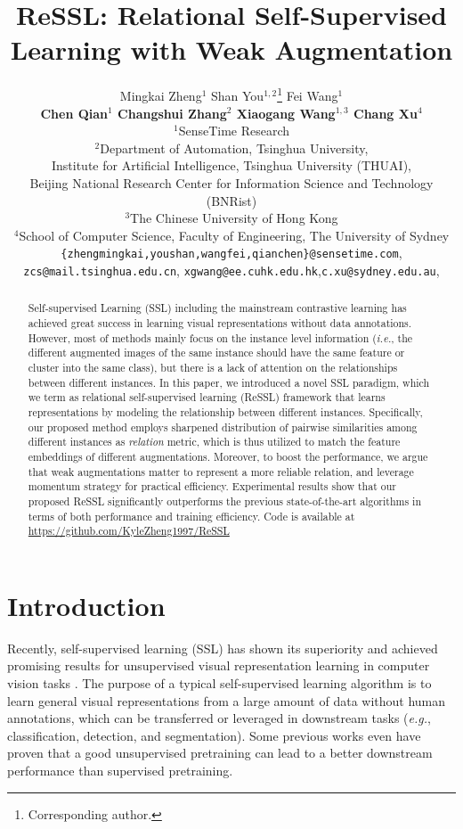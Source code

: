 \documentclass{article}
\title{ReSSL: Relational Self-Supervised Learning with Weak Augmentation}
\author{Mingkai Zheng$^1$ \quad Shan You$^{1,2}$\thanks{Corresponding author.}  \quad Fei Wang$^1$\\
	 \textbf{Chen Qian$^1$ \quad Changshui Zhang$^{2}$ \quad Xiaogang Wang$^{1,3}$ \quad Chang Xu$^4$}\\
	$^1$SenseTime Research\\
	 $^{2}$Department of Automation, Tsinghua University,\\
Institute for Artificial Intelligence, Tsinghua University (THUAI), \\
Beijing National Research Center for Information Science and Technology (BNRist)\\
	 $^3$The Chinese University of Hong Kong\\
	$^4$School of Computer Science, Faculty of Engineering, The University of Sydney\\
	 \texttt{\{zhengmingkai,youshan,wangfei,qianchen\}@sensetime.com}, \\
 \texttt{zcs@mail.tsinghua.edu.cn}, \texttt{xgwang@ee.cuhk.edu.hk},\texttt{c.xu@sydney.edu.au},\\ 
	
}
\newcommand{\<}{\left\langle}
\renewcommand{\>}{\right\rangle}
\newcommand{\eg}{{\emph{e.g.}}}
\newcommand{\ie}{{\emph{i.e.}}}
\begin{document}
\maketitle

\vspace{-10pt}
\begin{abstract}
\vspace{-10pt}


Self-supervised Learning (SSL) including the mainstream contrastive learning has achieved great success in learning visual representations without data annotations. However, most of methods mainly focus on the instance level information (\ie, the different augmented images of the same instance should have the same feature or cluster into the same class), but there is a lack of attention on the relationships between different instances. In this paper, we introduced a novel SSL paradigm, which we term as relational self-supervised learning  (ReSSL) framework that learns representations by modeling the relationship between different instances. Specifically, our proposed method employs sharpened distribution of pairwise similarities among different instances as \textit{relation} metric, which is thus utilized to match the feature embeddings of different augmentations. Moreover, to boost the performance, we argue that weak augmentations matter to represent a more reliable relation, and leverage momentum strategy for practical efficiency. Experimental results show that our proposed ReSSL significantly outperforms the previous state-of-the-art algorithms in terms of both performance and training efficiency. Code is available at \href{https://github.com/KyleZheng1997/ReSSL}{https://github.com/KyleZheng1997/ReSSL}



\end{abstract}

\section{Introduction}

Recently, self-supervised learning (SSL) has shown its superiority and achieved promising results for unsupervised visual representation learning in computer vision tasks \cite{cmc, deepinfomax, cpc, simclr, SimSiam, instance_discrimination, byol, moco}. The purpose of a typical self-supervised learning algorithm is to learn general visual representations from a large amount of data without human annotations, which can be transferred or leveraged in downstream tasks (\eg, classification, detection, and segmentation). Some previous works \cite{swav, byol} even have proven that a good unsupervised pretraining can lead to a better downstream performance than supervised pretraining.  
\end{document}
